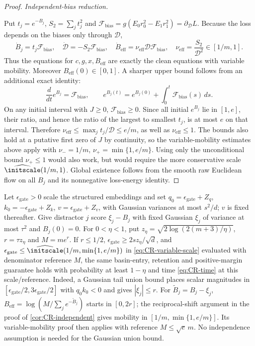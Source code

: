\begin{proof}
\emph{Independent-bias reduction.}

Put $t_j=e^{-B_j}$, $S_2=\sum_jt_j^2$ and
$\mathcal F_{\mathrm{bias}}=g(E_0r_0^2-E_1r_1^2)=\partial_{\mathcal D} L$.
Because the loss depends on the biases only through $\mathcal D$,
\begin{equation}
 \dot B_j=t_j\mathcal F_{\mathrm{bias}},\quad \dot{\mathcal D}=-S_2\mathcal F_{\mathrm{bias}},\quad
 \dot B_{\mathrm{eff}}=\nu_{\mathrm{eff}}\mathcal D\mathcal F_{\mathrm{bias}},\quad
 \nu_{\mathrm{eff}}=\frac{S_2}{\mathcal D^2}\in[1/m,1].
 \label{eq:CR-independent-flow}
\end{equation}
Thus the equations for $c,g,x,B_{\mathrm{eff}}$ are exactly the clean equations with variable mobility.
Moreover $B_{\mathrm{eff}}(0)\in[0,1]$.
A sharper upper bound follows from an additional exact identity:
\[
 \frac{d}{dt}e^{B_j}=\mathcal F_{\mathrm{bias}},\qquad
 e^{B_j(t)}=e^{B_j(0)}+\int_0^t\mathcal F_{\mathrm{bias}}(s)\,ds.
\]
On any initial interval with $J\ge0$, $\mathcal F_{\mathrm{bias}}\ge0$.
Since all initial $e^{B_j}$ lie in $[1,e]$, their ratio, and hence the ratio of the largest to smallest $t_j$, is at most $e$ on that interval.
Therefore $\nu_{\mathrm{eff}}\le\max_jt_j/\mathcal D\le e/m$, as well as $\nu_{\mathrm{eff}}\le1$.
The bounds also hold at a putative first zero of $J$ by continuity, so the variable-mobility estimates above apply with
$\nu_-=1/m$, $\nu_+=\min\{1,e/m\}$.
Using only the unconditional bound $\nu_+\le1$ would also work, but would require the more conservative scale
$\widehat\initscale(1/m,1)$.
Global existence follows from the smooth raw Euclidean flow on all $B_j$ and its nonnegative loss-energy identity.
\end{proof}

\begin{remark}
\label{cor:CR-scalar-Gaussian}
Let $\epsilon_{\mathrm{gate}}>0$ scale the structured embeddings and set
$q_0=\epsilon_{\mathrm{gate}}+Z_q$, $k_0=-\epsilon_{\mathrm{gate}}+Z_k$,
$v=\epsilon_{\mathrm{gate}}+Z_v$, with Gaussian variances at most $s^2/d$;
$v$ is fixed thereafter. Give distractor $j$ score $\xi_j-B_j$ with fixed
Gaussian $\xi_j$ of variance at most $\tau^2$ and $B_j(0)=0$.
For $0<\eta<1$, put $z_\eta=\sqrt{2\log(2(m+3)/\eta)}$,
$r=\tau z_\eta$ and $M=me^r$. If $r\le1/2$,
$\epsilon_{\mathrm{gate}}\ge2sz_\eta/\sqrt d$, and
$\epsilon_{\mathrm{gate}}\le\widehat\initscale(1/m,\min\{1,e/m\})$
in \cref{eq:CR-variable-scale} evaluated with denominator reference $M$,
the same basin-entry, retention and positive-margin guarantee holds with
probability at least $1-\eta$ and time \cref{eq:CR-time} at this scale/reference.
Indeed, a Gaussian tail union bound places scalar magnitudes in
$[\epsilon_{\mathrm{gate}}/2,3\epsilon_{\mathrm{gate}}/2]$ with $q_0k_0<0$
and gives $|\xi_j|\le r$. For $\widetilde B_j=B_j-\xi_j$,
$B_{\mathrm{eff}}=\log(M/\sum_j e^{-\widetilde B_j})$ starts in $[0,2r]$;
the reciprocal-shift argument in the proof of \cref{cor:CR-independent}
gives mobility in $[1/m,\min\{1,e/m\}]$. Its variable-mobility proof then
applies with reference $M\le\sqrt e\,m$. No independence assumption is
needed for the Gaussian union bound.
\end{remark}

